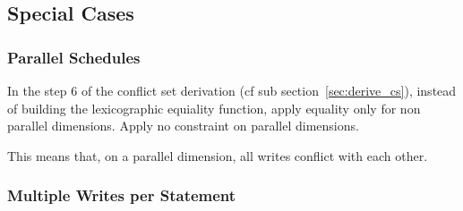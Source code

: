 \documentclass{article}
\begin{document}

\subsection{Special Cases}

\subsubsection{Parallel Schedules}

In the step 6 of the conflict set derivation (cf sub
section~\ref{sec:derive_cs}), instead of building the lexicographic equiality
function, apply equality only for non parallel dimensions. Apply no constraint
on parallel dimensions.

This means that, on a parallel dimension, all writes conflict with each other.

\subsubsection{Multiple Writes per Statement}
\label{sec:multiwrite}
\end{document}
